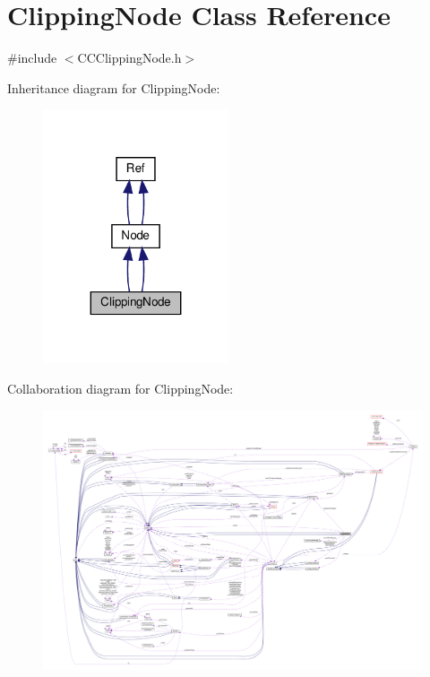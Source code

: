 \hypertarget{classClippingNode}{}\section{Clipping\+Node Class Reference}
\label{classClippingNode}


{\ttfamily \#include $<$C\+C\+Clipping\+Node.\+h$>$}



Inheritance diagram for Clipping\+Node\+:
\nopagebreak
\begin{figure}[H]
\begin{center}
\leavevmode
\includegraphics[width=155pt]{classClippingNode__inherit__graph}
\end{center}
\end{figure}


Collaboration diagram for Clipping\+Node\+:
\nopagebreak
\begin{figure}[H]
\begin{center}
\leavevmode
\includegraphics[width=350pt]{classClippingNode__coll__graph}
\end{center}
\end{figure}
